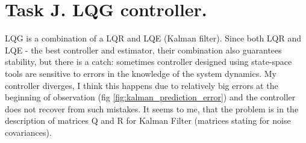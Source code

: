 \documentclass[12pt,letterpaper]{article}
\begin{document}
\section*{Task J. LQG controller.}
\label{Q:J}
    LQG is a combination of a LQR and LQE (Kalman filter). Since both LQR and LQE - the best controller and estimator, their combination also guarantees stability, but there is a catch: sometimes controller designed using state-space tools are sensitive to errors in the knowledge of the system dynamics. My controller diverges, I think this happens due to relatively big errors at the beginning of observation (fig \ref{fig:kalman_prediction_error}) and the controller does not recover from such mistakes. It seems to me, that the problem is in the description of matrices Q and R for Kalman Filter (matrices stating for noise covariances).
\end{document}
